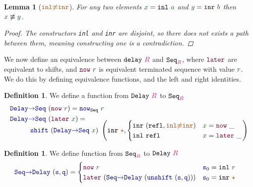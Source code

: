 \documentclass[twoside,11pt,openright]{report}
\theoremstyle{plain} %
\newtheorem{lem}[thm]{Lemma}
\theoremstyle{definition}
\newtheorem{defn}[thm]{Definition}%
\theoremstyle{remark}
\newcommand*{\term}[1]{\textcolor{green!30!black}{#1}} %
\newcommand*{\type}[1]{\textcolor{magenta!90!black}{#1}}
\newcommand*{\constant}[1]{\textcolor{orange!60!black}{\ensuremath{\mathtt{#1}}}}
\newcommand*{\function}[1]{\textcolor{blue!60!black}{\ensuremath{\mathtt{#1}}}}
\newcommand*{\constructor}[1]{\textcolor{purple!60!black}{\ensuremath{\mathtt{#1}}}}
\newcommand*{\typeformer}[1]{\ensuremath{\mathtt{#1}}}
\newcommand*{\unitelem}{\constant{\star}} %
\begin{document}
\begin{lem}[\(\constant{inl{\not\equiv}inr}\)]
  For any two elements \(\term{x} = \mathtt{inl}~\term{a}\) and \(\term{y} = \mathtt{inr}~\term{b}\) then \(\term{x} \not\equiv \term{y}\).
  \begin{proof}
    The constructors \texttt{inl} and \texttt{inr} are disjoint, so there does not exists a path between them, meaning constructing one is a contradiction.
  \end{proof}
\end{lem}
\noindent We now define an equivalence between \(\typeformer{delay}~\type{R}\) and \(\typeformer{Seq}_{\type{R}}\), where \(\constructor{later}\) are equivalent to shifts, and \(\constructor{now}~\term{r}\) is equivalent terminated sequence with value \(\term{r}\). We do this by defining equivalence functions, and the left and right identities.
\begin{defn}
  We define a function from \(\typeformer{Delay}~\type{R}\) to \(\typeformer{Seq}_{\type{R}}\)
  \begin{equation}
    \begin{aligned}
      \function{Delay{\rightarrow}Seq}&~(\constructor{now}~\term{r}) = \function{now}_{\typeformer{Seq}}~\term{r} \\
      \function{Delay{\rightarrow}Seq}&~(\constructor{later}~\term{x}) = \\[-3mm]
      & \strut\hspace{-8mm}\function{shift}~(\function{Delay{\rightarrow}Seq}~\term{x})~\left(\mathtt{inr}~\unitelem , \begin{cases} \mathtt{inr}~(\mathtt{refl} , \constant{inl{\not\equiv}inr}) & \term{x} = \constructor{now}~\_ \\ \mathtt{inl}~\mathtt{refl} & \term{x} = \constructor{later}~\_ \end{cases}\right)
    \end{aligned}
  \end{equation}
\end{defn}
\begin{defn}
  We define function from \(\typeformer{Seq}_{\type{R}}\) to \(\typeformer{Delay}~\type{R}\)
    \begin{equation}
      \begin{aligned}
        \function{Seq{\rightarrow}Delay}&~(\function{s} , \function{q}) = \begin{cases} \constructor{now}~\term{r} & \function{s}_0 = \mathtt{inl}~\term{r} \\ \constructor{later}~(\function{Seq{\rightarrow}Delay}~(\function{unshift}~(\function{s} , \function{q}))) & \function{s}_0 = \mathtt{inr}~\unitelem \end{cases}
      \end{aligned}
    \end{equation}
\end{defn}
\end{document}
